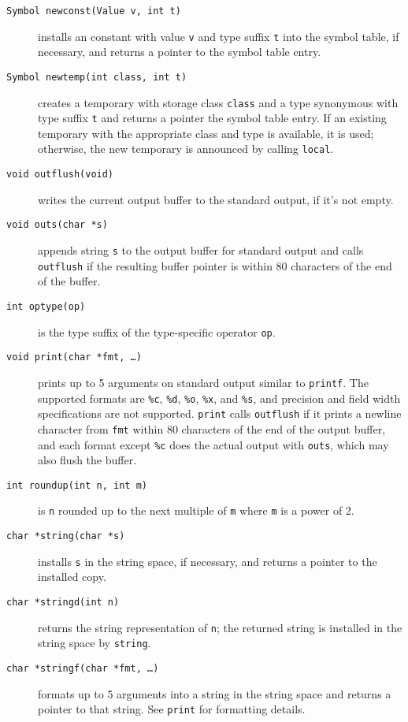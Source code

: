 \begin{description}
\item[{\tt Symbol newconst(Value v, int t)}] installs an constant with value \verb|v|
and type suffix \verb|t| into the symbol table, if necessary,
and returns a pointer to the symbol table entry.

\item[{\tt Symbol newtemp(int class, int t)}] creates a temporary
with storage class \verb|class| and a type synonymous with type suffix \verb|t|
and returns a pointer the symbol table entry.
If an existing temporary with the appropriate class and type is available,
it is used; otherwise, the new temporary is announced by calling \verb|local|.

\item[{\tt void outflush(void)}] writes the current output buffer
to the standard output, if it's not empty.

\item[{\tt void outs(char *s)}] appends string \verb|s| to the output buffer
for standard output and calls \verb|outflush|
if the resulting buffer pointer is within 80 characters
of the end of the buffer.

\item[{\tt int optype(op)}] is the type suffix of the type-specific operator \verb|op|.

\item[{\tt void print(char *fmt, \ldots)}] prints up to 5 arguments on standard output
similar to \verb|printf|. The supported formats are
\verb|%c|, \verb|%d|, \verb|%o|, \verb|%x|, and \verb|%s|, 
and precision and field width specifications are not supported.
\verb|print| calls \verb|outflush| if it prints a newline character from
\verb|fmt| within 80 characters of the end of the output buffer,
and each format except \verb|%c| does the actual output
with \verb|outs|, which may also flush the buffer.

\item[{\tt int roundup(int n, int m)}] is \verb|n| rounded up to the
next multiple of \verb|m| where \verb|m| is a power of 2.

\item[{\tt char *string(char *s)}] installs \verb|s| in the string space,
if necessary, and returns a pointer to the installed copy.

\item[{\tt char *stringd(int n)}] returns the string representation of \verb|n|;
the returned string is installed in the string space by \verb|string|.

\item[{\tt char *stringf(char *fmt, \ldots)}] formats up to 5 arguments
into a string in the string space and returns a pointer to that string.
See \verb|print| for formatting details.


\end{description}

